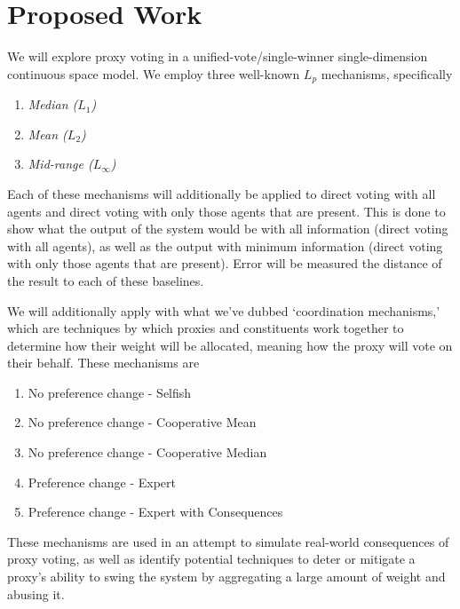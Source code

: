 \section{Proposed Work}\label{sec:contribution}
We will explore proxy voting in a unified-vote/single-winner single-dimension
continuous space model.
We employ three well-known $L_p$ mechanisms, specifically
\begin{enumerate}
    \item {
        \textit{Median ($L_1$)}
    }
    \item {
        \textit{Mean ($L_2$)}
    }
    \item {
        \textit{Mid-range ($L_\infty$)}
    }
\end{enumerate}
Each of these mechanisms will additionally be applied to direct voting with all
agents and direct voting with only those agents that are present.
This is done to show what the output of the system would be with all information
(direct voting with all agents), as well as the output with minimum information
(direct voting with only those agents that are present).
Error will be measured the distance of the result to each of these baselines.

We will additionally apply with what we've dubbed `coordination mechanisms,' which
are techniques by which proxies and constituents work together to determine how their
weight will be allocated, meaning how the proxy will vote on their behalf.
These mechanisms are
\begin{enumerate}
    \item {
        No preference change - Selfish
    }
    \item {
        No preference change - Cooperative Mean
    }
    \item {
        No preference change - Cooperative Median
    }
    \item {
        Preference change - Expert
    }
    \item {
        Preference change - Expert with Consequences
    }
\end{enumerate}
These mechanisms are used in an attempt to simulate real-world consequences of proxy
voting, as well as identify potential techniques to deter or mitigate a proxy's
ability to swing the system by aggregating a large amount of weight and abusing it.

